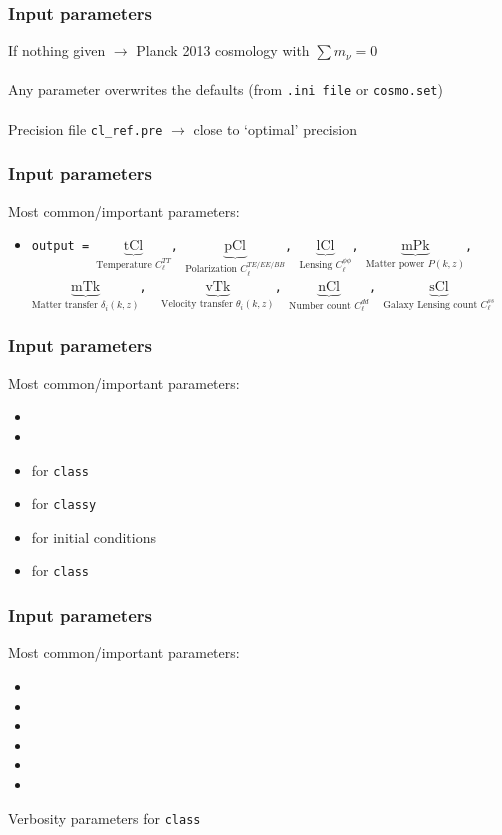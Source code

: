 \begin{frame}[fragile]
	\frametitle{Input parameters}
	If nothing given $\to$ {\Red Planck 2013 cosmology} with $\sum m_\nu = 0$\\ 
	\mbox{} \\
	Any parameter {\Red overwrites} the defaults (from {\Red \tt .ini file} or {\Purple \tt cosmo.set})\\
	\mbox{} \\
	Precision file {\Red \tt cl\_ref.pre} $\to$ close to `optimal' precision
\end{frame}



\begin{frame}[fragile]
	\frametitle{Input parameters}
	Most common/important parameters:
	\begin{itemize}
		\item \texttt{output = {\Red $\underbrace{\text{tCl}}_\text{Temperature $C_\ell^{TT}$}$, $\underbrace{\text{pCl}}_\text{Polarization $C_\ell^{TE/EE/BB}$}$, $\underbrace{\text{lCl}}_\text{Lensing $C_\ell^{\phi \phi}$}$}, {\Purple $\underbrace{\text{mPk}}_\text{Matter power $P(k,z)$}$, $\underbrace{\text{mTk}}_\text{Matter transfer $\delta_i(k,z)$}$, }
		$\underbrace{\text{vTk}}_\text{Velocity transfer $\theta_i(k,z)$}$,
		$\underbrace{\text{nCl}}_\text{Number count $C_\ell^{dd}$}$, 
		$\underbrace{\text{sCl}}_\text{Galaxy Lensing count $C_\ell^{ss}$}$ }
	\end{itemize}
\end{frame}

\begin{frame}[fragile]
	\frametitle{Input parameters}
	Most common/important parameters:
	\begin{itemize}
		\item {}
		\item {}
		\item {}  for {\Red \tt class}
		\item {}  for {\Purple \tt classy}
		\item {} for initial conditions
		\item {} for {\Red \tt class}
	\end{itemize}
\end{frame}


\begin{frame}[fragile]
	\frametitle{Input parameters}
	Most common/important parameters:
	\begin{itemize}
		\item {}
		\item {}
		\item {}
		\item {}
		\item {}
		\item {}
	\end{itemize}
	Verbosity parameters for {\Red \tt class}
\end{frame}


